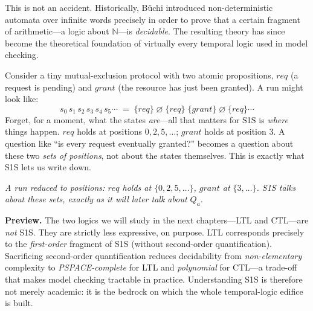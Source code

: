 This is not an accident.  Historically, Büchi introduced non-deterministic
automata over infinite words precisely in order to prove that a certain
fragment of arithmetic---a logic about $\mathbb{N}$---is \emph{decidable}.
The resulting theory has since become the theoretical foundation of
virtually every temporal logic used in model checking.

\begin{example}
\label{ex:s1s-run-to-word}
Consider a tiny mutual-exclusion protocol with two atomic propositions,
$\mathit{req}$ (a request is pending) and $\mathit{grant}$ (the resource
has just been granted).  A run might look like:
\[
  s_0\, s_1\, s_2\, s_3\, s_4\, s_5 \cdots \;=\;
  \{\mathit{req}\}\;\varnothing\;\{\mathit{req}\}\;\{\mathit{grant}\}\;
  \varnothing\;\{\mathit{req}\} \cdots
\]
Forget, for a moment, what the states \emph{are}---all that matters for
S1S is \emph{where} things happen.  $\mathit{req}$ holds at positions
$0, 2, 5, \ldots$; $\mathit{grant}$ holds at position $3$.  A question
like ``is every request eventually granted?'' becomes a question about
these two \emph{sets of positions}, not about the states themselves.
This is exactly what S1S lets us write down.
\end{example}

\begin{center}
  \par
  {\small\itshape A run reduced to positions: $\mathit{req}$ holds at
  $\{0,2,5,\ldots\}$, $\mathit{grant}$ at $\{3,\ldots\}$.  S1S talks
  about these sets, exactly as it will later talk about $Q_a$.}
\end{center}

\medskip\noindent
\textbf{Preview.}  The two logics we will study in the next chapters---LTL
and CTL---are \emph{not} S1S.  They are strictly less expressive, on
purpose.  LTL corresponds precisely to the \emph{first-order} fragment of
S1S (without second-order quantification).  Sacrificing second-order
quantification reduces decidability from \emph{non-elementary} complexity
to \emph{PSPACE-complete} for LTL and \emph{polynomial} for CTL---a
trade-off that makes model checking tractable in practice.  Understanding
S1S is therefore not merely academic: it is the bedrock on which the
whole temporal-logic edifice is built.

